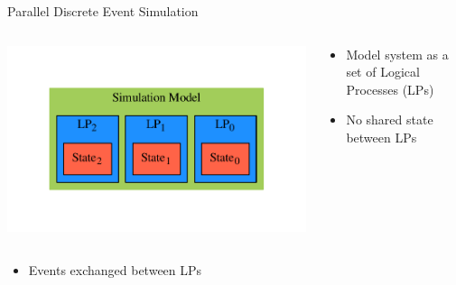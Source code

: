 \documentclass[10pt]{beamer}
\begin{document}
\begin{frame}{Parallel Discrete Event Simulation}

    \begin{columns}[c]
    \begin{column}{0.4\textwidth}
        \includegraphics[width=\textwidth]{../figs/graphviz/pdes.pdf}
    \end{column}
    \begin{column}{0.6\textwidth}
        \begin{itemize}
            \item Model system as a set of Logical Processes (LPs)
            \item No shared state between LPs
        \end{itemize}
    \end{column}
    \end{columns}

    \begin{itemize}
        \item Events exchanged between LPs
    \end{itemize}


\end{frame}
\end{document}
